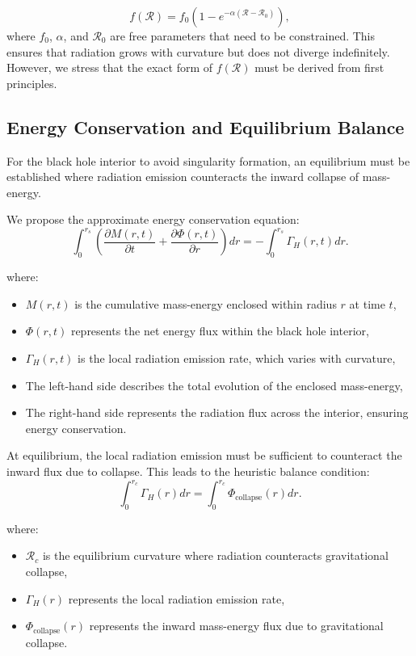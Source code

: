 \begin{equation}
    f(\mathcal{R}) = f_0 \left( 1 - e^{-\alpha (\mathcal{R} - \mathcal{R}_0)} \right),
\end{equation}
where \( f_0 \), \( \alpha \), and \( \mathcal{R}_0 \) are free parameters that need to be constrained. This ensures that radiation grows with curvature but does not diverge indefinitely. However, we stress that the exact form of \( f(\mathcal{R}) \) must be derived from first principles.

\subsection{Energy Conservation and Equilibrium Balance}

For the black hole interior to avoid singularity formation, an equilibrium must be established where radiation emission counteracts the inward collapse of mass-energy.

We propose the approximate energy conservation equation:
\begin{equation}
    \int_0^{r_s} \left( \frac{\partial M(r, t)}{\partial t} + \frac{\partial \Phi(r,t)}{\partial r} \right) dr = -\int_0^{r_s} \Gamma_H(r,t) dr.
\end{equation}

where:
\begin{itemize}
    \item \( M(r,t) \) is the cumulative mass-energy enclosed within radius \( r \) at time \( t \),
    \item \( \Phi(r,t) \) represents the net energy flux within the black hole interior,
    \item \( \Gamma_H(r,t) \) is the local radiation emission rate, which varies with curvature,
    \item The left-hand side describes the total evolution of the enclosed mass-energy,
    \item The right-hand side represents the radiation flux across the interior, ensuring energy conservation.
\end{itemize}

At equilibrium, the local radiation emission must be sufficient to counteract the inward flux due to collapse. This leads to the heuristic balance condition:
\begin{equation}
    \int_0^{r_c} \Gamma_H(r) dr = \int_0^{r_c} \Phi_{\text{collapse}}(r) dr.
\end{equation}

where:
\begin{itemize}
    \item \( \mathcal{R}_c \) is the equilibrium curvature where radiation counteracts gravitational collapse,
    \item \( \Gamma_H(r) \) represents the local radiation emission rate,
    \item \( \Phi_{\text{collapse}}(r) \) represents the inward mass-energy flux due to gravitational collapse.
\end{itemize}

